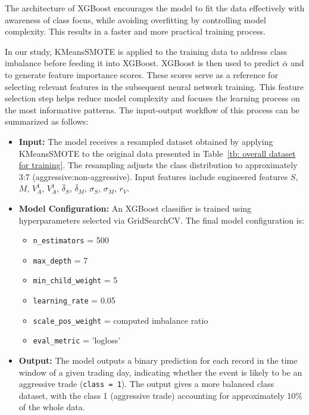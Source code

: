 The architecture of XGBoost encourages the model to fit the data effectively with awareness of class focus, while avoiding overfitting by controlling model complexity. This results in a faster and more practical training process.

In our study, KMeansSMOTE is applied to the training data to address class imbalance before feeding it into XGBoost. XGBoost is then used to predict $\bar{\alpha}$ and to generate feature importance scores. These scores serve as a reference for selecting relevant features in the subsequent neural network training. This feature selection step helps reduce model complexity and focuses the learning process on the most informative patterns. The input-output workflow of this process can be summarized as follows:
\begin{itemize}
  \item \textbf{Input:}  
  The model receives a resampled dataset obtained by applying KMeansSMOTE to the original data presented in Table~\ref{tb: overall dataset for training}. The resampling adjusts the class distribution to approximately 3:7 (aggressive:non-aggressive). Input features include engineered features $S$, $M$, $V_A^{1}$, $V_A^{1}$, $\bar{\delta}_S$, $\bar{\delta}_M$, $\sigma_S$, $\sigma_M$, $r_V$.

  \item \textbf{Model Configuration:}  
  An XGBoost classifier is trained using hyperparameters selected via GridSearchCV. The final model configuration is:
  \begin{itemize}
    \item \texttt{n\_estimators} = 500
    \item \texttt{max\_depth} = 7
    \item \texttt{min\_child\_weight} = 5
    \item \texttt{learning\_rate} = 0.05
    \item \texttt{scale\_pos\_weight} = computed imbalance ratio
    \item \texttt{eval\_metric} = 'logloss'
  \end{itemize}

  \item \textbf{Output:}  
  The model outputs a binary prediction for each record in the time window of a given trading day, indicating whether the event is likely to be an aggressive trade (\texttt{class = 1}). The output gives a more balanced class dataset, with the class 1 (aggressive trade) accounting for approximately 10\% of the whole data.

\end{itemize}

